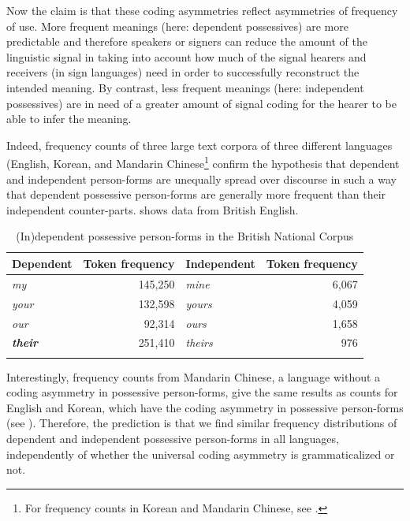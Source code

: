 \documentclass[output=paper]{langsci/langscibook}
\begin{document}
Now the claim is that these coding asymmetries reflect asymmetries of frequency of use. More frequent meanings (here: dependent possessives) are more predictable and therefore speakers or signers can reduce the amount of the linguistic signal in taking into account how much of the signal hearers and receivers (in sign languages) need in order to successfully reconstruct the intended meaning. By contrast, less frequent meanings (here: independent possessives) are in need of a greater amount of signal coding for the hearer to be able to infer the meaning. 

Indeed, frequency counts of three large text corpora of three different languages (English, Korean, and Mandarin Chinese\footnote{For frequency counts in Korean and Mandarin Chinese, see \citealt{Ye2017}.} confirm the hypothesis that dependent and independent person-forms are unequally spread over discourse in such a way that dependent possessive person-forms are generally more frequent than their independent counter-parts.  shows data from British English.

\begin{table}
\begin{tabularx}{\textwidth}{XrXr}
\lsptoprule

\bfseries Dependent & \bfseries Token frequency & \bfseries Independent & \bfseries Token frequency\\
\midrule
\textit{my} & 145,250 & \textit{mine} & 6,067\\
\textit{your} & 132,598 & \textit{yours} & 4,059\\
\textit{our} & 92,314 & \textit{ours} & 1,658\\
\textbf{\textit{their}}{\textbf{\textit{~}}} & 251,410 & \textit{theirs} & 976\\
\lspbottomrule
\end{tabularx}

\caption{(In)dependent possessive person-forms in the British National Corpus}
\label{tab:michaelis:2}
\end{table}

Interestingly, frequency counts from Mandarin Chinese, a language without a coding asymmetry in possessive person-forms, give the same results as counts for English and Korean, which have the coding asymmetry in possessive person-forms (see \citealt{Ye2017}). Therefore, the prediction is that we find similar frequency distributions of dependent and independent possessive person-forms in all languages, independently of whether the universal coding asymmetry is grammaticalized or not.
\end{document}
